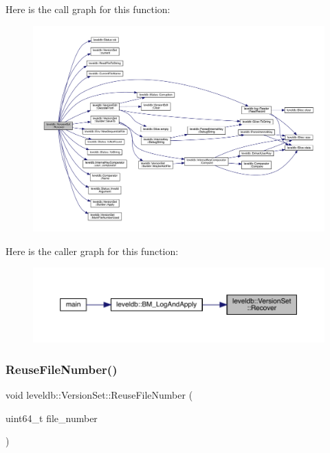 Here is the call graph for this function\+:
\nopagebreak
\begin{figure}[H]
\begin{center}
\leavevmode
\includegraphics[width=350pt]{classleveldb_1_1_version_set_a456517154663338d106225cbbc254551_cgraph}
\end{center}
\end{figure}
Here is the caller graph for this function\+:
\nopagebreak
\begin{figure}[H]
\begin{center}
\leavevmode
\includegraphics[width=350pt]{classleveldb_1_1_version_set_a456517154663338d106225cbbc254551_icgraph}
\end{center}
\end{figure}
\mbox{\label{classleveldb_1_1_version_set_a8131cebf5be3283e2ce1029e8be0d14e}} 
\subsubsection{\texorpdfstring{ReuseFileNumber()}{ReuseFileNumber()}}
{\footnotesize\ttfamily void leveldb\+::\+Version\+Set\+::\+Reuse\+File\+Number (\begin{DoxyParamCaption}\item[{uint64\+\_\+t}]{file\+\_\+number }\end{DoxyParamCaption})\hspace{0.3cm}{\ttfamily [inline]}}

